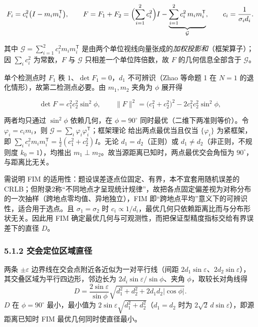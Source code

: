 \documentclass[UTF8, zihao=5,AutoFakeBold=2]{ctexart}
\begin{document}
		\begin{equation}
			F_i=c_i^2\bigl(I-m_im_i^{\mathsf T}\bigr),\qquad
			F=F_1+F_2=\Bigl(\sum_{i=1}^{2}c_i^2\Bigr)I-\underbrace{\sum_{i=1}^{2}c_i^2\,m_im_i^{\mathsf T}}_{\mathcal G},\qquad c_i=\frac{1}{\sigma_i d_i}.
			\label{eq:F2}
		\end{equation}
		
		其中 \(\mathcal G=\sum_{i=1}^2 c_i^2m_im_i^{\mathsf T}\) 是由两个单位视线向量张成的\emph{加权投影和}（框架算子）；因 \(\sum_i c_i^2\) 为常数，\(F\) 与 \(\mathcal G\) 只相差一个单位阵倍数，故 \(F\) 的几何信息全部含于 \(\mathcal G\)。
		
		单个检测点时 \(F_1\) 秩 \(1\)、\(\det F_1=0\)，\(d_1\) 不可辨识（Zhao 等命题 1 在 \(N=1\) 的退化情形），故第二检测点必要。由 \(m_1,m_2\) 夹角为 \(\phi\) 展开得
		
		\begin{equation}
			\det F=c_1^2c_2^2\sin^2\phi,\qquad
			\lVert F\rVert^2=\bigl(c_1^2+c_2^2\bigr)^2-2c_1^2c_2^2\sin^2\phi,
			\label{eq:det}
		\end{equation}
		
		两者均只通过 \(\sin^2\phi\) 依赖几何，在 \(\phi=90^\circ\) 同时最优（二维下两准则等价）。令 \(\varphi_i=c_im_i\)，则 \(\mathcal G=\sum_i\varphi_i\varphi_i^{\mathsf T}\)；框架理论\cite{zhao2012} 给出两点最优当且仅当 \(\{\varphi_i\}\) 为紧框架，即 \(\sum_i c_i^2m_im_i^{\mathsf T}=\tfrac12(c_1^2+c_2^2)I\)。无论 \(d_1=d_2\)（正则）或 \(d_1\neq d_2\)（非正则，不规则度 \(k_0=1\)），均推出 \(m_1\perp m_2\)。故当源距离已知时，两点最优交会角恒为 \(90^\circ\)，与距离比无关。

		需说明 FIM 的适用性：题设误差逐点位固定、有界，本不宜套用随机误差的 CRLB；但附录2称“不同地点才呈现统计规律”，故把各点固定偏差视为对称分布的一次抽样（跨地点零均值、异地独立），FIM 即“跨地点平均”意义下的可辨识性，适合用于选点。且 \(\sigma_1=\sigma_2\) 时 \(c_i\propto1/d_i\)，最优几何只依赖距离比而与分布形状无关。因此用 FIM 确定最优几何与可观测性，而把保证型精度指标交给有界误差下的直径 \(D\)。

		\subsubsection*{5.1.2 交会定位区域直径}
		两条 \(\pm\varepsilon\) 边界线在交会点附近各近似为一对平行线（间距 \(2d_1\sin\varepsilon\)、\(2d_2\sin\varepsilon\)），其交叠区域为平行四边形，邻边长为 \(2d_i\sin\varepsilon/\sin\phi\)、夹角 \(\phi\)，取较长对角线得
		\begin{equation}
			D=\frac{2\sin\varepsilon}{\sin\phi}\sqrt{d_1^2+d_2^2+2d_1d_2|\cos\phi|}.
			\label{eq:D}
		\end{equation}
		\(D\) 在 \(\phi=90^\circ\) 最小，最小值为 \(2\sin\varepsilon\sqrt{d_1^2+d_2^2}\)（\(d_1=d_2\) 时为 \(2\sqrt2\,d\sin\varepsilon\)），即源距离已知时 FIM 最优几何同时使直径最小。
\end{document}
